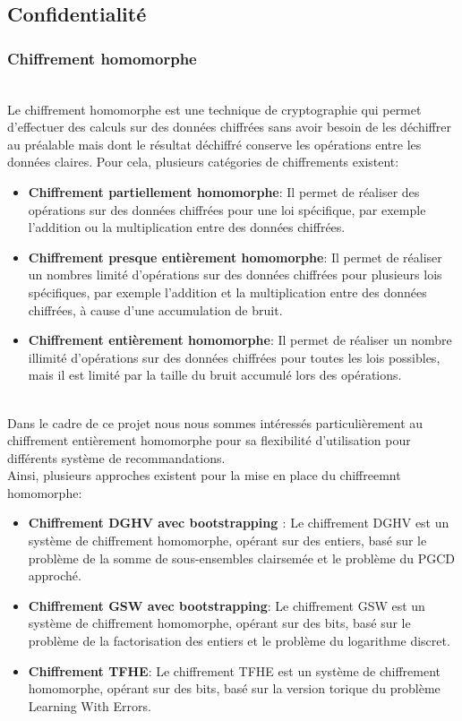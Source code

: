 \documentclass{article}
\begin{document}
\subsection{Confidentialité}
\subsubsection{Chiffrement homomorphe}
$ $\\
Le chiffrement homomorphe est une technique de cryptographie qui permet d'effectuer des calculs sur des données chiffrées sans avoir besoin de les déchiffrer au préalable mais dont le résultat déchiffré conserve les opérations entre les données claires.
Pour cela, plusieurs catégories de chiffrements existent:\\
\begin{itemize}
    \item \textbf{Chiffrement partiellement homomorphe}: Il permet de réaliser des opérations sur des données chiffrées pour une loi spécifique, par exemple l'addition ou la multiplication entre des données chiffrées.
    \item \textbf{Chiffrement presque entièrement homomorphe}: Il permet de réaliser un nombres limité d'opérations sur des données chiffrées pour plusieurs lois spécifiques, par exemple l'addition et la multiplication entre des données chiffrées, à cause d'une accumulation de bruit.
    \item \textbf{Chiffrement entièrement homomorphe}: Il permet de réaliser un nombre illimité d'opérations sur des données chiffrées pour toutes les lois possibles, mais il est limité par la taille du bruit accumulé lors des opérations.
\end{itemize}
$ $\\
Dans le cadre de ce projet nous nous sommes intéressés particulièrement au chiffrement entièrement homomorphe pour sa flexibilité d'utilisation pour différents système de recommandations.\\
Ainsi, plusieurs approches existent pour la mise en place du chiffreemnt homomorphe: \\
\begin{itemize}
    \item \textbf{Chiffrement DGHV avec bootstrapping \cite{boots}}: Le chiffrement DGHV \cite{dghv} est un système de chiffrement homomorphe, opérant sur des entiers, basé sur le problème de la somme de sous-ensembles clairsemée et le problème du PGCD approché.
    \item \textbf{Chiffrement GSW avec bootstrapping\cite{boots}}: Le chiffrement GSW \cite{gsw} est un système de chiffrement homomorphe, opérant sur des bits, basé sur le problème de la factorisation des entiers et le problème du logarithme discret.
    \item \textbf{Chiffrement TFHE}: Le chiffrement TFHE \cite{tfhe} est un système de chiffrement homomorphe, opérant sur des bits, basé sur la version torique du problème Learning With Errors.
\end{itemize}
\end{document}
